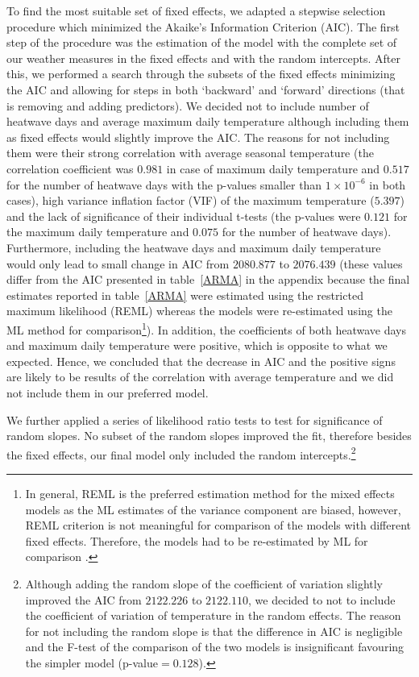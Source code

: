 \documentclass[12pt]{iopart}
\begin{document}
To find the most suitable set of fixed effects, we adapted a stepwise selection procedure which minimized the Akaike's Information Criterion (AIC). The first step of the procedure was the estimation of the model with the complete set of our weather measures in the fixed effects and with the random intercepts. After this, we performed a search through the subsets of the fixed effects minimizing the AIC and allowing for steps in both `backward' and `forward' directions (that is removing and adding predictors). We decided not to include number of heatwave days and average maximum daily temperature although including them as fixed effects would slightly improve the AIC. The reasons for not including them were their strong correlation with average seasonal temperature (the correlation coefficient was $0.981$ in case of maximum daily temperature and $0.517$ for the number of heatwave days with the p-values smaller than $1\times10^{-6}$ in both cases), high variance inflation factor (VIF) of the maximum temperature ($5.397$) and the lack of significance of their individual t-tests (the p-values were $0.121$ for the maximum daily temperature and $0.075$ for the number of heatwave days). Furthermore, including the heatwave days and maximum daily temperature would only lead to small change in AIC from $2080.877$ to $2076.439$ (these values differ from the AIC presented in table~\ref{ARMA} in the appendix because the final estimates reported in table~\ref{ARMA} were estimated using the restricted maximum likelihood (REML) whereas the models were re-estimated using the ML method for comparison\footnote{In general, REML is the preferred estimation method for the mixed effects models as the ML estimates of the variance component are biased, however, REML criterion is not meaningful for comparison of the models with different fixed effects. Therefore, the models had to be re-estimated by ML for comparison \cite{Zuur2009}.}). In addition, the coefficients of both heatwave days and maximum daily temperature were positive, which is opposite to what we expected. Hence, we concluded that the decrease in AIC and the positive signs are likely to be results of the correlation with average temperature and we did not include them in our preferred model.

We further applied a series of likelihood ratio tests to test for significance of random slopes. No subset of the random slopes improved the fit, therefore besides the fixed effects, our final model only included the random intercepts.\footnote{Although adding the random slope of the coefficient of variation slightly improved the AIC from $2122.226$ to $2122.110$, we decided to not to include the coefficient of variation of temperature in the random effects. The reason for not including the random slope is that the difference in AIC is negligible and the F-test of the comparison of the two models is insignificant favouring the simpler model (p-value$=0.128$).} 
\end{document}
